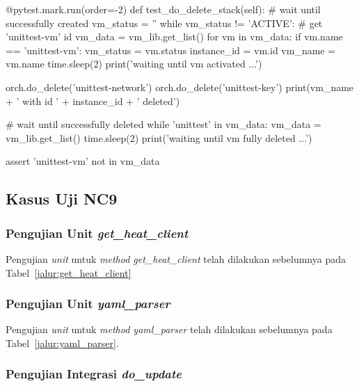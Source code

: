 \begin{code}
\begin{ignasicblock}[title=test\_do\_delete\_stack,minted language=Python]
@pytest.mark.run(order=-2)
def test_do_delete_stack(self):
    # wait until successfully created
    vm_status = ''
    while vm_status != 'ACTIVE':
        # get 'unittest-vm' id
        vm_data = vm_lib.get_list()
        for vm in vm_data:
            if vm.name == 'unittest-vm':
                vm_status = vm.status
                instance_id = vm.id
                vm_name = vm.name
        time.sleep(2)
        print('waiting until vm activated ...')

    orch.do_delete('unittest-network')
    orch.do_delete('unittest-key')
    print(vm_name + ' with id ' + instance_id + ' deleted')

    # wait until successfully deleted
    while 'unittest' in vm_data:
        vm_data = vm_lib.get_list()
        time.sleep(2)
        print('waiting until vm fully deleted ...')

    assert 'unittest-vm' not in vm_data
\end{ignasicblock}
  \label{ts:rm_stack}
\end{code}

\subsection{Kasus Uji NC9}

\subsubsection{Pengujian Unit \emph{get\_heat\_client}}

\noindent
Pengujian \emph{unit} untuk \emph{method get\_heat\_client} telah dilakukan sebelumnya
pada Tabel~\ref{jalur:get_heat_client}

\subsubsection{Pengujian Unit \emph{yaml\_parser}}

\noindent
Pengujian \emph{unit} untuk \emph{method yaml\_parser} telah dilakukan sebelumnya
pada Tabel~\ref{jalur:yaml_parser}.

\subsubsection{Pengujian Integrasi \emph{do\_update}}

